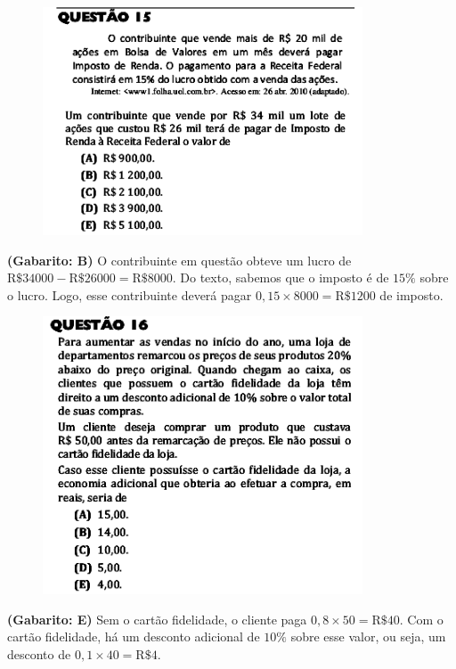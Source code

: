 \documentclass[a4paper]{article}
\begin{document}
\begin{figure}[H]
	\begin{center}
		\includegraphics[width=9.5cm]{L3Q15.png}
	\end{center}
\end{figure}
\par\textbf{(Gabarito: B)} O contribuinte em questão obteve um lucro de $\text{R\$}34000 - \text{R\$}26000 = \text{R\$}8000$. Do texto, sabemos que o imposto é de $15\%$ sobre o lucro. Logo, esse contribuinte deverá pagar $0,15\times 8000 = \text{R\$}1200$ de imposto.
\begin{figure}[H]
	\begin{center}
		\includegraphics[width=9.5cm]{L3Q16.png}
	\end{center}
\end{figure}
\par\textbf{(Gabarito: E)} Sem o cartão fidelidade, o cliente paga $0,8\times 50 = \text{R\$}40$. Com o cartão fidelidade, há um desconto adicional de $10\%$ sobre esse valor, ou seja, um desconto de $0,1\times 40 = \text{R\$}4$.
\end{document}
